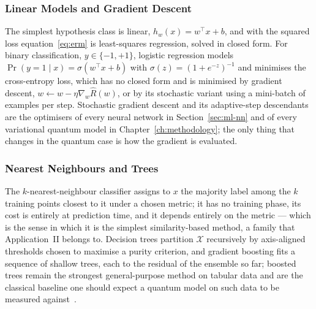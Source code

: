 \subsubsection{Linear Models and Gradient Descent}
The simplest hypothesis class is linear, $h_w(x) = w^\top x + b$, and with
the squared loss equation~\eqref{eq:erm} is least-squares regression, solved
in closed form. For binary classification, $y \in \{-1, +1\}$, logistic
regression models $\Pr(y = 1 \mid x) = \sigma(w^\top x + b)$ with
$\sigma(z) = (1 + e^{-z})^{-1}$ and minimises the cross-entropy loss, which
has no closed form and is minimised by gradient descent,
$w \leftarrow w - \eta \nabla_w \hat{R}(w)$, or by its stochastic variant
using a mini-batch of examples per step. Stochastic gradient descent and its
adaptive-step descendants are the optimisers of every neural network in
Section~\ref{sec:ml-nn} and of every variational quantum model in
Chapter~\ref{ch:methodology}; the only thing that changes in the quantum
case is how the gradient is evaluated.

\subsubsection{Nearest Neighbours and Trees}
The $k$-nearest-neighbour classifier assigns to $x$ the majority label among
the $k$ training points closest to it under a chosen metric; it has no
training phase, its cost is entirely at prediction time, and it depends
entirely on the metric --- which is the sense in which it is the simplest
similarity-based method, a family that Application~II belongs to. Decision
trees partition $\mathcal{X}$ recursively by axis-aligned thresholds chosen
to maximise a purity criterion, and gradient boosting fits a sequence of
shallow trees, each to the residual of the ensemble so far; boosted trees
remain the strongest general-purpose method on tabular data and are the
classical baseline one should expect a quantum model on such data to be
measured against~\cite{Bowles_2024}.

